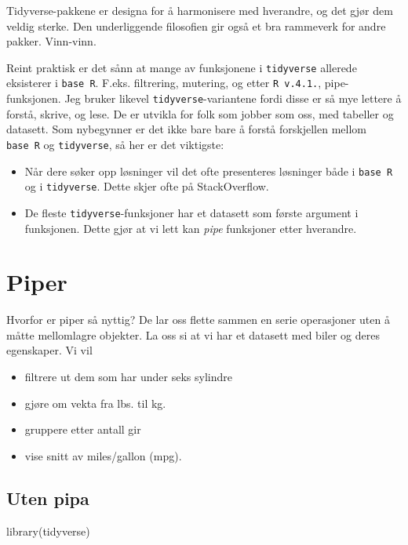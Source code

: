 \documentclass[
  letterpaper,
  DIV=11,
  numbers=noendperiod]{scrreprt}
\newenvironment{Shaded}{\begin{snugshade}}{\end{snugshade}}
\newcommand{\FunctionTok}[1]{\textcolor[rgb]{0.28,0.35,0.67}{#1}}
\newcommand{\NormalTok}[1]{\textcolor[rgb]{0.00,0.23,0.31}{#1}}
\providecommand{\tightlist}{%
  \setlength{\itemsep}{0pt}\setlength{\parskip}{0pt}}\usepackage{longtable,booktabs,array}
\begin{document}
Tidyverse-pakkene er designa for å harmonisere med hverandre, og det
gjør dem veldig sterke. Den underliggende filosofien gir også et bra
rammeverk for andre pakker. Vinn-vinn.

Reint praktisk er det sånn at mange av funksjonene i \texttt{tidyverse}
allerede eksisterer i \texttt{base\ R}. F.eks. filtrering, mutering, og
etter \texttt{R\ v.4.1.}, pipe-funksjonen. Jeg bruker likevel
\texttt{tidyverse}-variantene fordi disse er så mye lettere å forstå,
skrive, og lese. De er utvikla for folk som jobber som oss, med tabeller
og datasett. Som nybegynner er det ikke bare bare å forstå forskjellen
mellom \texttt{base\ R} og \texttt{tidyverse}, så her er det viktigste:

\begin{itemize}
\tightlist
\item
  Når dere søker opp løsninger vil det ofte presenteres løsninger både i
  \texttt{base\ R} og i \texttt{tidyverse}. Dette skjer ofte på
  StackOverflow.
\item
  De fleste \texttt{tidyverse}-funksjoner har et datasett som første
  argument i funksjonen. Dette gjør at vi lett kan \emph{pipe}
  funksjoner etter hverandre.
\end{itemize}

\hypertarget{piper}{%
\section{Piper}\label{piper}}

Hvorfor er piper så nyttig? De lar oss flette sammen en serie
operasjoner uten å måtte mellomlagre objekter. La oss si at vi har et
datasett med biler og deres egenskaper. Vi vil

\begin{itemize}
\tightlist
\item
  filtrere ut dem som har under seks sylindre
\item
  gjøre om vekta fra lbs. til kg.
\item
  gruppere etter antall gir
\item
  vise snitt av miles/gallon (mpg).
\end{itemize}

\hypertarget{uten-pipe}{%
\subsection{Uten pipa}\label{uten-pipe}}

\begin{Shaded}
\begin{Highlighting}[]
\FunctionTok{library}\NormalTok{(tidyverse)}
\end{Highlighting}
\end{Shaded}
\end{document}
